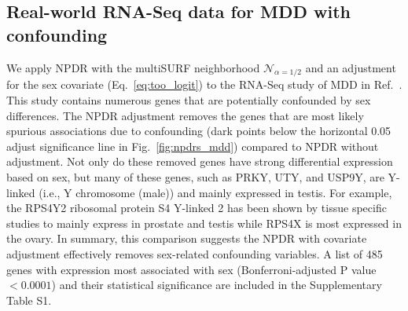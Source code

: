 \documentclass[10pt]{article}
\begin{document}
\subsection{Real-world RNA-Seq data for MDD with confounding}
We apply NPDR with the multiSURF neighborhood $\mathcal{N}_{\alpha=1/2}$ and an adjustment for the sex covariate (Eq.~\ref{eq:too_logit}) to the RNA-Seq study of MDD in Ref.~\cite{mostafavi14}.
This study contains numerous genes that are potentially confounded by sex differences. 
The NPDR adjustment removes the genes that are most likely spurious associations due to confounding (dark points below the horizontal 0.05 adjust significance line in Fig.~\ref{fig:npdrs_mdd}) compared to NPDR without adjustment. 
Not only do these removed genes have strong differential expression based on sex, but many of these genes, such as PRKY, UTY, and USP9Y, are Y-linked (i.e., Y chromosome (male)) and mainly expressed in testis. For example, the RPS4Y2 ribosomal protein S4 Y-linked 2 has been shown by tissue specific studies to mainly express in prostate and testis \cite{lopes2010human} while RPS4X is most expressed in the ovary. 
In summary, this comparison suggests the NPDR with covariate adjustment effectively removes sex-related confounding variables.
A list of 485 genes with expression most associated with sex (Bonferroni-adjusted P value $<0.0001$) and their statistical significance are included in the Supplementary Table S1.
\end{document}

